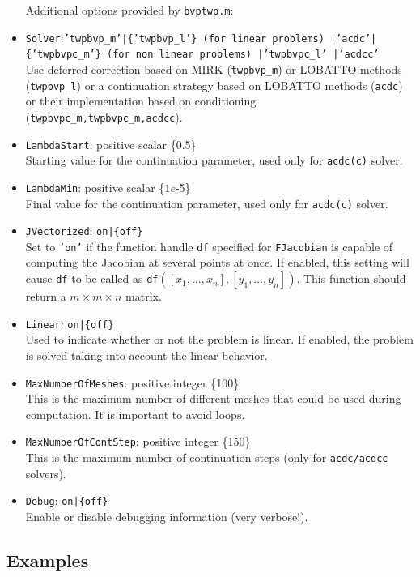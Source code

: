 \documentclass{article}
\begin{document}
\begin{itemize}
  Additional options provided by \texttt{bvptwp.m}:
 \item \texttt{Solver}:\texttt{'twpbvp\_m'|\{'twpbvp\_l'\}
 (for linear problems) |'acdc'|\{'twpbvpc\_m'\} (for
 non linear problems) |'twpbvpc\_l'  |'acdcc'} \\
  Use deferred correction based on MIRK
 (\texttt{twpbvp\_m}) or LOBATTO methods (\texttt{twpbvp\_l}) or a continuation
 strategy based on LOBATTO methods (\texttt{acdc}) or their implementation
 based on conditioning (\texttt{twpbvpc\_m,twpbvpc\_m,acdcc}).  
 \item \texttt{LambdaStart}: positive scalar \{0.5\}\\  Starting value for the continuation parameter, used only for \texttt{acdc(c)} solver.
 \item \texttt{LambdaMin}: positive scalar \{$1e$-5\}\\  Final value for the continuation parameter, used only for \texttt{acdc(c)} solver.
 \item \texttt{JVectorized}: \texttt{on|\{off\}} \\
  Set to \texttt{'on'} if the function handle \texttt{df} specified for \texttt{FJacobian}
   is capable of computing the Jacobian at several points at once. If enabled, this setting
    will cause \texttt{df} to be called as \texttt{df}$([x_1, \ldots, x_n],[y_1,
    \ldots, y_n])$. This function should return a $m \times m \times n$ matrix.
 \item \texttt{Linear}: \texttt{on|\{off\}} \\
  Used to indicate whether or not the problem is linear. If enabled, the problem is solved taking
  into account the linear behavior.
 \item \texttt{MaxNumberOfMeshes}: positive integer \{100\}\\
  This is the maximum number of different meshes that could be used during
  computation. It is important to avoid loops.
  \item \texttt{MaxNumberOfContStep}: positive integer \{150\} \\
  This is the maximum number of continuation steps  (only for
  \texttt{acdc/acdcc} solvers).
 \item \texttt{Debug}: \texttt{on|\{off\}} \\
  Enable or disable debugging information (very verbose!).
\end{itemize}

 
\pagebreak

\subsection{Examples}
\label{Exa}
\end{document}
